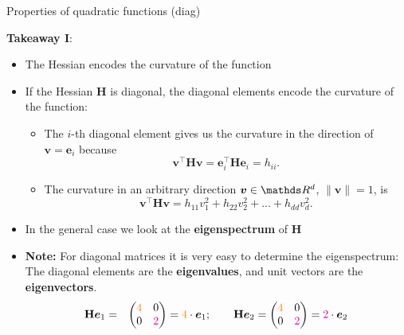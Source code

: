   \begin{frame}{Properties of quadratic functions (diag)}
  
  \textbf{Takeaway I}: 
  
  \begin{itemize}
    \item The Hessian encodes the curvature of the function 
    \item If the Hessian $\mathbf{H}$ is diagonal, the diagonal elements encode the curvature of the function: 
  
    \begin{itemize}
      \item The $i$-th diagonal element gives us the curvature in the direction of $\bm{v} = \bm{e}_i$ because 
      $$
      \bm{v}^\top \bm{H} \bm{v} = \bm{e}_i^\top \bm{H} \bm{e}_i = h_{ii}.
      $$
      \item The curvature in an arbitrary direction $\bm{v}
      \in \R^d$, $\|\bm{v}\| = 1$, is 
      $$
      \bm{v}^\top\mathbf{H}\bm{v} = h_{11} v_1^2 + h_{22}v_2^2 + ... + h_{dd}v_d^2. 
      $$
    \end{itemize}
  
    \item<2-> In the general case we look at the \textbf{eigenspectrum} of $\mathbf{H}$ 
    \vspace*{0.2cm}
    \item<2->[] \begin{footnotesize}
    \textbf{Note: } 	For diagonal matrices it is very easy to determine the eigenspectrum: The diagonal elements are the \textbf{eigenvalues}, and unit vectors are the \textbf{eigenvectors}. 
    \begin{eqnarray*}
      \mathbf{H} \bm{e}_1 &=& \begin{pmatrix} \textcolor{orange}{4} & 0 \\ 0 & \textcolor{magenta}{2} \end{pmatrix} = \textcolor{orange}{4} \cdot \bm{e}_1; \qquad \mathbf{H} \bm{e}_2 = \begin{pmatrix} \textcolor{orange}{4} & 0 \\ 0 & \textcolor{magenta}{2} \end{pmatrix} = \textcolor{magenta}{2} \cdot \bm{e}_2 \\		
    \end{eqnarray*}	
    \end{footnotesize}
  
  \end{itemize}
  
  
  \end{frame}
  
